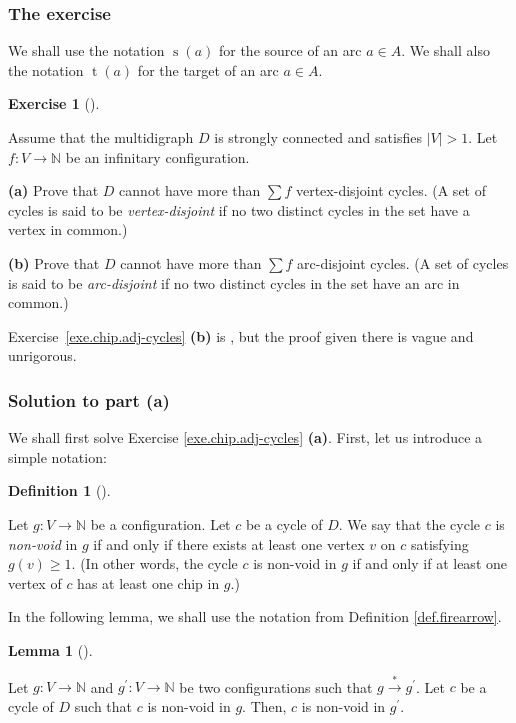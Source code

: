 \documentclass[numbers=enddot,12pt,final,onecolumn,notitlepage]{scrartcl}%
\newcounter{exer}
\theoremstyle{definition}
\newtheorem{lem}[theo]{Lemma}
\newenvironment{lemma}[1][]
{\begin{lem}[#1]\begin{leftbar}}
{\end{leftbar}\end{lem}}
\newtheorem{defi}[theo]{Definition}
\newenvironment{definition}[1][]
{\begin{defi}[#1]\begin{leftbar}}
{\end{leftbar}\end{defi}}
\newtheorem{exmp}[exer]{Exercise}
\newenvironment{exercise}[1][]
{\begin{exmp}[#1]\begin{leftbar}}
{\end{leftbar}\end{exmp}}
\let\sumnonlimits\sum
\renewcommand{\sum}{\sumnonlimits\limits}
\newcommand{\NN}{\mathbb{N}}
\newcommand{\abs}[1]{\left| #1 \right|}
\newcommand{\tup}[1]{\left( #1 \right)}
\begin{document}
\subsubsection{The exercise}

We shall use the notation
$\operatorname{s}\tup{a}$ for the source of an arc
$a \in A$.
We shall also the notation
$\operatorname{t}\tup{a}$ for the target of an arc
$a \in A$.

\begin{exercise} \label{exe.chip.adj-cycles}
Assume that the multidigraph $D$ is strongly connected
and satisfies $\abs{V} > 1$.
Let $f : V \to \NN$ be an infinitary configuration.

\textbf{(a)} Prove that $D$ cannot have more than
$\sum f$ vertex-disjoint cycles.
(A set of cycles is said to be \textit{vertex-disjoint}
if no two distinct cycles in the set have a vertex in
common.)

\textbf{(b)} Prove that $D$ cannot have more than
$\sum f$ arc-disjoint cycles.
(A set of cycles is said to be \textit{arc-disjoint}
if no two distinct cycles in the set have an arc in
common.)
\end{exercise}

Exercise~\ref{exe.chip.adj-cycles} \textbf{(b)} is
\cite[Theorem 2.2]{BjoLov92}, but the proof given there
is vague and unrigorous.

\subsubsection{Solution to part \textbf{(a)}}

We shall first solve Exercise \ref{exe.chip.adj-cycles} \textbf{(a)}.
First, let us introduce a simple notation:

\begin{definition}
\label{def.chip.cycle-non-void}Let $g:V\rightarrow\mathbb{N}$ be a
configuration. Let $c$ be a cycle of $D$. We say that the cycle $c$ is
\textit{non-void} in $g$ if and only if there exists at least one vertex $v$
on $c$ satisfying $g\left(  v\right)  \geq1$. (In other words, the cycle $c$
is non-void in $g$ if and only if at least one vertex of $c$ has at least one
chip in $g$.)
\end{definition}

In the following lemma, we shall use the notation from Definition
\ref{def.firearrow}.

\begin{lemma}
\label{lem.chip.adj-cycles.cycles-preserve}Let $g:V\rightarrow\mathbb{N}$ and
$g^{\prime}:V\rightarrow\mathbb{N}$ be two configurations such that
$g\overset{\ast}{\rightarrow}g^{\prime}$. Let $c$ be a cycle of $D$ such that
$c$ is non-void in $g$. Then, $c$ is non-void in $g^{\prime}$.
\end{lemma}
\end{document}
